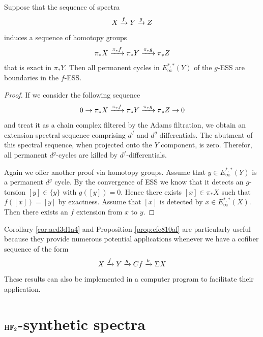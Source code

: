 \documentclass{amsart}
\numberwithin{equation}{section}
\newcommand{\HF}{\mathrm{H}\bF_2}
\begin{document}
\begin{proposition}\label{prop:cfe810af}
    Suppose that the sequence of spectra
    $$X\xrightarrow{f}Y\xrightarrow{g}Z$$
    induces a sequence of homotopy groups
    $$\pi_*X\xrightarrow{\pi_*f}\pi_*Y\xrightarrow{\pi_*g}\pi_*Z$$
    that is exact in $\pi_*Y$. Then all permanent cycles in $E^{*,*}_\infty(Y)$ of the $g$-ESS are boundaries in the $f$-ESS.
\end{proposition}

\begin{proof}
    If we consider the following sequence
    \begin{equation}\label{eq:8c7eec14}
        0\to \pi_*X\xrightarrow{\pi_*f}\pi_*Y\xrightarrow{\pi_*g}\pi_*Z\to 0
    \end{equation}
    and treat it as a chain complex filtered by the Adams filtration, we obtain an extension spectral sequence comprising $d^f$ and $d^g$ differentials. The abutment of this spectral sequence, when projected onto the $Y$ component, is zero. Therefor, all permanent $d^g$-cycles are killed by $d^f$-differentials.

    Again we offer another proof via homotopy groups. Assume that $y\in E^{*,*}_\infty(Y)$ is a permanent $d^g$ cycle. By the convergence of ESS we know that it detects an $g$-torsion $[y]\in \{y\}$ with $g([y])=0$. Hence there exists $[x]\in \pi_*X$ such that $f([x])=[y]$ by exactness. Assume that $[x]$ is detected by $x\in E^{*,*}_\infty(X)$. Then there exists an $f$ extension from $x$ to $y$.
\end{proof}

Corollary \ref{cor:aed3d1a4} and Proposition \ref{prop:cfe810af} are particularly useful because they provide numerous potential applications whenever we have a cofiber sequence of the form
$$X\xrightarrow{f}Y\xrightarrow{g}Cf\xrightarrow{h}\Sigma X$$
These results can also be implemented in a computer program to facilitate their application.

\section{$\HF$-synthetic spectra} \label{sec:synthetic}
%


%
%
%
%
%
%
%
%
%
%
%
%
%
%
%
%
%
%

%
%
%

%
%
%
%
%
%
%


%
%
%
%
%
%
%
%
%
%
%
%
%
%

%
%
%
%

%
%
%

%
%
%
\end{document}
